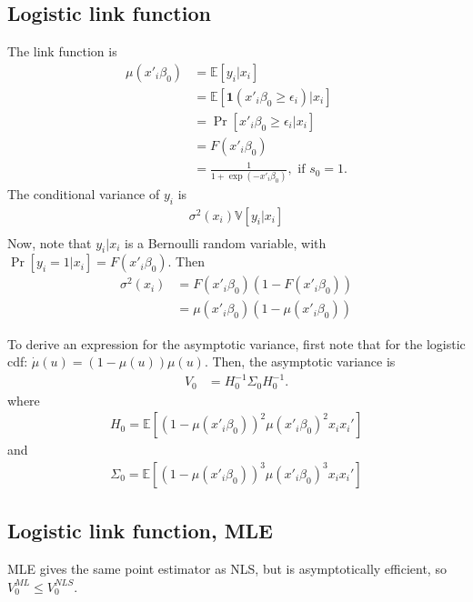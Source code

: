 \documentclass[12pt]{article}
\newcommand{\E}{\mathbb{E}}
\newcommand{\V}{\mathbb{V}}
\newcommand{\e}{\epsilon}
\newcommand{\mtx}[1]{\ensuremath{\bm{\mathit{#1}}}}
\begin{document}
\subsection{Logistic link function}
The link function is
\begin{align*}
\mu(\mtx{x}'_i\mtx{\beta}_0) &=\E[y_i|\mtx{x}_i]\\
&= \E[\bm{1}(\mtx{x}'_i\mtx{\beta}_0 \geq \e_i) |\mtx{x}_i ]\\
&=\Pr[\mtx{x}'_i\mtx{\beta}_0 \geq \e_i |\mtx{x}_i ]\\
&= F(\mtx{x}'_i\mtx{\beta}_0)\\
&= \frac{1}{1+ \exp(-\mtx{x}'_i\mtx{\beta}_0)}, \text{ if } s_0 = 1.
\end{align*}
The conditional variance of $y_i$ is
\begin{align*}
\sigma^2(\mtx{x}_i)  \V[y_i | \mtx{x}_i]\\
\end{align*}
Now, note that $y_i|\mtx{x}_i$ is a Bernoulli random variable, with $\Pr[y_i=1 |\mtx{x}_i] = F(\mtx{x}'_i\mtx{\beta}_0)$. Then
\begin{align*}
\sigma^2(\mtx{x}_i)  &= F(\mtx{x}'_i\mtx{\beta}_0)(1-F(\mtx{x}'_i\mtx{\beta}_0))\\
&= \mu(\mtx{x}'_i\mtx{\beta}_0)(1-\mu(\mtx{x}'_i\mtx{\beta}_0))
\end{align*}

To derive an expression for the asymptotic variance, first note that for the logistic cdf: $\dot \mu(u) = (1-\mu(u))\mu(u)$. Then, the asymptotic variance is 
\begin{align*}
\mtx{V}_0 &= H_0^{-1}\Sigma_0 H_0^{-1}.
\end{align*}
where
\begin{align*}
H_0 = \E[(1-\mu(\mtx{x}'_i\mtx{\beta}_0))^2 \mu(\mtx{x}'_i\mtx{\beta}_0)^2 \mtx{x}_i\mtx{x}_i']
\end{align*}
and
\begin{align*}
\Sigma_0 =  \E[(1-\mu(\mtx{x}'_i\mtx{\beta}_0))^3 \mu(\mtx{x}'_i\mtx{\beta}_0)^3 \mtx{x}_i\mtx{x}_i']
\end{align*}

\subsection{Logistic link function, MLE}
MLE gives the same point estimator as NLS, but is asymptotically efficient, so $\mtx{V}_0^{ML} \leq \mtx{V}_0^{NLS}$.
\end{document}
